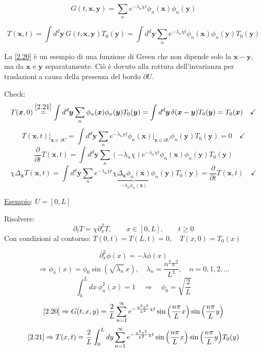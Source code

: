 \documentclass[a4paper,11pt]{report}
\newcommand{\x}{\boldsymbol{x}}
\newcommand{\y}{\boldsymbol{y}}
\begin{document}
\begin{equation}
G(t,\x,\y)=\sum_{n}e^{-\lambda_n\chi t}\phi_n(\x)\phi_n(\y )
\label{2.20}
\end{equation}

\begin{equation}
T(\x,t)=\int d^d\y\, G(t,\x,\y)T_0(\y )=\int d^d \y \sum_{n}e^{-\lambda_n\chi t}\phi_n(\x)\phi_n(\y )T_0(\y )
\label{2.21}
\end{equation}

La \eqref{2.20} \`e un esempio di una funzione di Green che non dipende solo la $\x-\y $, ma da $\x$ e $\y $ separatamente. 
Ci\`o \`e dovuto alla rottura dell'invarianza per traslazioni a causa della presenza del bordo $\partial U$.

\medskip

Check: 
\[
T(\x,0)\overset{\eqref{2.21}}{=}\int d^d \y \sum_{n}\phi_n(\x)\phi_n(\y )T_0(\y )=\int d^d\y\, \delta(\x-\y )T_0(\y )=T_0(\x) \quad \checkmark
\]
\[
T(\x,t)\Big|_{\x\in\partial U}=\int d^d\y \sum_n e^{-\lambda_n \chi t} \phi_n(\x)\Big|_{\x\in\partial U}\phi_n(\y )T_0(\y )=0 \quad \checkmark
\]
\[
\frac{\partial}{\partial t}T(\x,t)=\int d^d\y \sum_n (-\lambda_n \chi)e^{-\lambda_n\chi t} \phi_n(\x)\phi_n(\y )T_0(\y )
\]
\[
\chi\Delta_{\x}T(\x,t)=\int d^d \y  \sum_n e^{-\lambda_n \chi t}\chi \underbrace{\Delta_{\x}\phi_n(\x)}_{-\lambda_n \phi_n(\x)} \phi_n(\y )T_0(\y )=\frac{\partial}{\partial t}T(\x,t) \quad \checkmark
\]

\medskip

\underline{Esempio}: $U=[0,L]$

Risolvere:
\[
\partial_t T=\chi\partial_{x}^2T, \qquad x\in[0,L], \qquad t\geq0
\]
Con condizioni al contorno: $T(0,t)=T(L,t)=0, \quad T(x,0)=T_0(x)$

\[
\partial^{2}_{x}\phi(x)=-\lambda\phi(x) 
\]
\[
\Rightarrow \phi_n(x)=\phi_0\sin{\left(\sqrt{\lambda_n}\, x\right)},\quad \lambda_n=\frac{n^2\pi^2}{L^2}, \quad n=0,1,2,\dots
\]
\[
\int_0^L dx\, \phi^2_n(x)=1 \quad\Rightarrow\quad \phi_0=\sqrt{\frac{2}{L}}
\]
\begin{equation}
\eqref{2.20}\Rightarrow G(t,x,y)=\frac{2}{L}\sum_{n=1}^{\infty}e^{-\frac{n^2\pi^2}{L^2}\chi t}\sin{\left(\frac{n\pi}{L}x\right)}\sin{\left(\frac{n\pi}{L}y\right)}
\label{2.22}
\end{equation}
\begin{equation}
\eqref{2.21}\Rightarrow T(x,t)=\frac{2}{L}\int_0^L dy\sum_{n=1}^{\infty}e^{-\frac{n^2\pi^2}{L^2}\chi t} \sin{\left(\frac{n\pi}{L}x\right)}\sin{\left(\frac{n\pi}{L}y\right)} T_0(y)
\label{2.23}
\end{equation}
\end{document}
